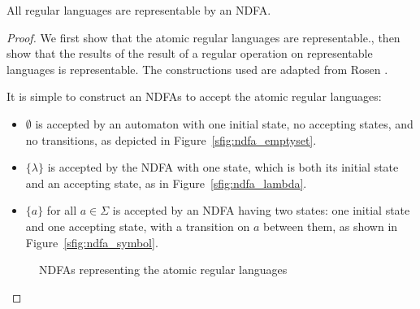 \documentclass{bcthesis}
\newcommand{\footcite}[2]{\xspace\cite[pg.~{#2}]{#1}\xspace}
\begin{document}
	\begin{claim}
	\label{prop:regular_languages_representable}
		All regular languages are representable by an NDFA.
	\end{claim}
	\begin{proof}
		We first show that the atomic regular languages are representable., then show that the results of the result of a regular operation on representable languages is representable. The constructions used are adapted from Rosen \footcite{rosen}{880--881}.

		It is simple to construct an NDFAs to accept the atomic regular languages:
		\begin{itemize}
			\item [] $\emptyset$ is accepted by an automaton with one initial state, no accepting states, and no transitions, as depicted in Figure~\ref{sfig:ndfa_emptyset}.
			\item [] $\{ \lambda \}$ is accepted by the NDFA with one state, which is both its initial state and an accepting state, as in Figure~\ref{sfig:ndfa_lambda}.
			\item [] $\{ a \}$ for all $a \in \Sigma$ is accepted by an NDFA having two states: one initial state and one accepting state, with a transition on $a$ between them, as shown in Figure~\ref{sfig:ndfa_symbol}.
		\end{itemize}


		\begin{figure}[H]
			\centering
			\setlength{\fboxrule}{0 pt}
			\caption{NDFAs representing the atomic regular languages}
			\label{fig:ndfa_atomic_regular_languages}
		\end{figure}


\end{proof}
\end{document}
